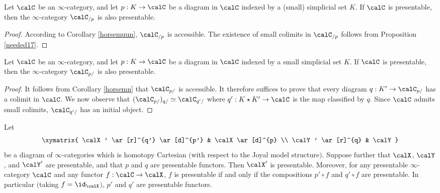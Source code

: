 \begin{proposition}\label{slicstab}
Let $\calC$ be an $\infty$-category, and let $p: K \rightarrow \calC$ be a diagram
in $\calC$ indexed by a (small) simplicial set $K$. If $\calC$ is presentable, then the $\infty$-category $\calC_{/p}$ is also presentable.
\end{proposition}

\begin{proof}
According to Corollary \ref{horsemuun}, $\calC_{/p}$ is accessible. The existence of small colimits in $\calC_{/p}$ follows from Proposition \ref{needed17}.
\end{proof}

\begin{proposition}\label{stabslic}
Let $\calC$ be an $\infty$-category, and let $p: K \rightarrow \calC$ be a diagram
in $\calC$ indexed by a small simplicial set $K$. If $\calC$ is presentable, then the $\infty$-category $\calC_{p/}$ is also presentable.
\end{proposition}

\begin{proof}
It follows from Corollary \ref{horsemn} that $\calC_{p/}$ is accessible. It therefore suffices to prove that every diagram $q: K' \rightarrow \calC_{p/}$ has a colimit in $\calC$. We now observe that
$(\calC_{p/})_{q/} \simeq \calC_{q'/}$ where $q': K \star K' \rightarrow \calC$ is the map classified by $q$. Since $\calC$ admits small colimits, $\calC_{q'/}$ has an initial object.
\end{proof}

\begin{proposition}\label{horse22}
Let $$ \xymatrix{ \calX' \ar[r]^{q'} \ar[d]^{p'} & \calX \ar[d]^{p} \\
\calY' \ar[r]^{q} & \calY }$$
be a diagram of $\infty$-categories which is homotopy Cartesian $($with respect to the Joyal model structure$)$. Suppose further that $\calX$, $\calY$, and $\calY'$ are presentable, and that
$p$ and $q$ are presentable functors. Then $\calX'$ is presentable. Moreover, for any presentable $\infty$-category $\calC$ and any functor $f: \calC \rightarrow \calX$, $f$ is presentable if and only if the compositions $p' \circ f$ and $q' \circ f$ are presentable. In particular $($taking $f = \id_{\calX}${}$)$, $p'$ and $q'$ are presentable functors.
\end{proposition}

